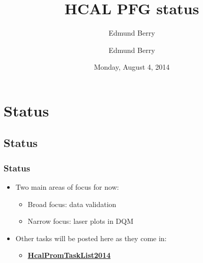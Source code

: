\documentclass[bigger]{beamer}
\title{HCAL PFG status}
\author{Edmund Berry}
\date{Monday, August 4, 2014}
\author[Edmund Berry]{\alert{Edmund Berry}}
\providecommand{\alert}[1]{\textbf{#1}}
\begin{document}
\maketitle


\section{Status}
\label{sec-1}
\subsection{Status}
\label{sec-1-1}
\begin{frame}
\frametitle{Status}
\label{sec-1-1-1}
\begin{itemize}

\item Two main areas of focus for now:
\label{sec-1-1-1-1}%
\begin{itemize}

\item Broad focus: data validation
\label{sec-1-1-1-1-1}%

\item Narrow focus: laser plots in DQM
\label{sec-1-1-1-1-2}%
\end{itemize} %

\item Other tasks will be posted here as they come in:
\label{sec-1-1-1-2}%
\begin{itemize}

\item \href{https://twiki.cern.ch/twiki/bin/viewauth/CMS/HcalPromTaskList2014}{\alert{HcalPromTaskList2014}}
\label{sec-1-1-1-2-1}%
\end{itemize} %
\end{itemize} %
\end{frame}
\end{document}
